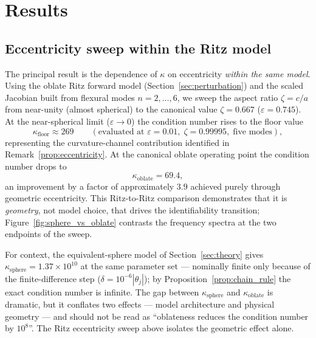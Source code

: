 \section{Results}\label{sec:results}

\subsection{Eccentricity sweep within the Ritz model}

The principal result is the dependence of $\kappa$ on eccentricity
\emph{within the same model}.  Using the oblate Ritz forward model
(Section~\ref{sec:perturbation}) and the scaled Jacobian built from flexural
modes $n=2,\ldots,6$, we sweep the aspect ratio $\zeta=c/a$ from near-unity
(almost spherical) to the canonical value $\zeta=0.667$
($\varepsilon=0.745$).  At the near-spherical limit
($\varepsilon \to 0$) the condition number rises to the floor value
\begin{equation}\label{eq:kappa_floor}
  \kappa_\mathrm{floor} \approx 269
  \qquad
  (\text{evaluated at } \varepsilon = 0.01,\;
  \zeta = 0.99995,\;\text{five modes}),
\end{equation}
representing the curvature-channel contribution identified in
Remark~\ref{prop:eccentricity}.  At the canonical oblate operating point
the condition number drops to
\begin{equation}
  \kappa_\mathrm{oblate} = 69.4,
\end{equation}
an improvement by a factor of approximately $3.9$ achieved purely through
geometric eccentricity.  This Ritz-to-Ritz comparison demonstrates that it is
\emph{geometry}, not model choice, that drives the identifiability transition;
Figure~\ref{fig:sphere_vs_oblate} contrasts the frequency spectra at the two
endpoints of the sweep.

\begin{remark}
For context, the equivalent-sphere model of
Section~\ref{sec:theory} gives $\kappa_\mathrm{sphere}=1.37\times10^{10}$
at the same parameter set --- nominally finite only because of the
finite-difference step ($\delta = 10^{-6}|\theta_j|$); by
Proposition~\ref{prop:chain_rule} the exact condition number is infinite.
The gap between $\kappa_\mathrm{sphere}$ and
$\kappa_\mathrm{oblate}$ is dramatic, but it conflates two effects ---
model architecture and physical geometry --- and should not be read as
``oblateness reduces the condition number by $10^8$''.
The Ritz eccentricity sweep above isolates the geometric effect alone.
\end{remark}

